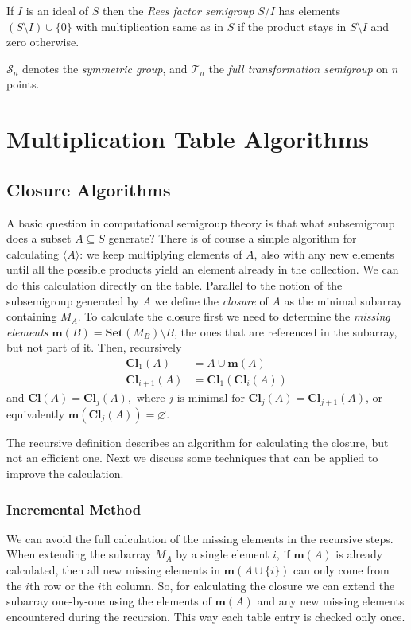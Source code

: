 \documentclass{amsart}
\newcommand{\cT}{{\mathcal T}}
\newcommand{\cS}{{\mathcal S}}
\newcommand{\Set}{\mathbf{Set}}
\newcommand{\Miss}{\mathbf{m}}
\newcommand{\Closure}{\mathbf{Cl}}
\theoremstyle{plain}
\theoremstyle{definition}
\begin{document}
If $I$ is an ideal of $S$ then the \emph{Rees factor semigroup} $S/I$ has elements $(S\setminus I)\cup\{0\}$ with multiplication same as in $S$ if the product stays in $S\setminus I$ and zero otherwise.

$\cS_n$ denotes the \emph{symmetric group}, and $\cT_n$ the \emph{full transformation semigroup} on $n$ points.

\section{Multiplication Table Algorithms}
\label{sec:multab}

\subsection{Closure Algorithms}
A basic question in computational semigroup theory is that what subsemigroup does a subset $A\subseteq S$ generate?
There is of course a simple algorithm for calculating $\langle A\rangle$: we keep multiplying elements of $A$, also with any new elements until all the possible products yield an element already in the collection.
We can do this calculation directly on the table. 
Parallel to the notion of the subsemigroup generated by $A$ we define the \emph{closure} of $A$ as the minimal subarray containing $M_A$.
To calculate the closure first we need to determine the \emph{missing elements} $\Miss(B)=\Set(M_B)\setminus B$, the ones that are referenced in the subarray, but not part of it.
Then, recursively
\begin{align*}
\Closure_1(A)&=A\cup\Miss(A)\\
\Closure_{i+1}(A)&=\Closure_1(\Closure_{i}(A))
\end{align*}
and
$ \Closure(A)=\Closure_j(A), \text{ where $j$ is minimal for }\Closure_j(A)=\Closure_{j+1}(A)$, or equivalently $\Miss(\Closure_j(A))=\varnothing$.

The recursive definition describes an algorithm for calculating the closure, but not an efficient one. Next we discuss some techniques that can be applied to improve the calculation.

\subsubsection{Incremental Method}
We can avoid the full calculation of the missing elements in the recursive steps.
When extending the subarray $M_A$ by a single element $i$, if $\Miss(A)$ is already calculated, then all new missing elements in $\Miss(A\cup\{i\})$ can only come from the $i$th row or the $i$th column.
So, for calculating the closure we can extend the subarray one-by-one using the elements of $\Miss(A)$ and any new missing elements encountered during the recursion.
This way each table entry is checked only once.
\end{document}
